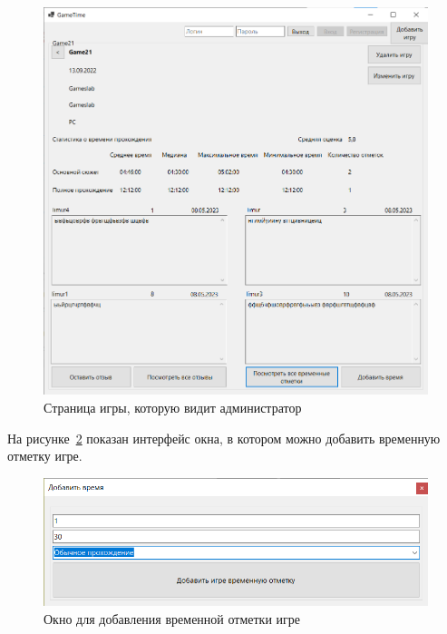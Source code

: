 \begin{figure}[H]
	\begin{center}
		\includegraphics[scale=0.7]{../imgs/interface/gamePageAdmin.png}
	\end{center}
	\captionsetup{justification=centering}
	\caption{Страница игры, которую видит администратор}
	\label{img:gamePageAdmin}
\end{figure}

На рисунке~\ref{img:addTimeRecord} показан интерфейс окна, в котором можно добавить временную отметку игре. 


\begin{figure}[H]
	\begin{center}
		\includegraphics[scale=0.8]{../imgs/interface/addTimeRecord.png}
	\end{center}
	\captionsetup{justification=centering}
	\caption{Окно для добавления временной отметки игре}
	\label{img:addTimeRecord}
\end{figure}
\clearpage

